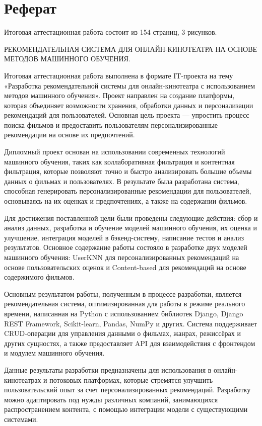 \chapter*{Реферат}

Итоговая аттестационная работа состоит из 154 страниц, 3 рисунков.

РЕКОМЕНДАТЕЛЬНАЯ СИСТЕМА ДЛЯ ОНЛАЙН-КИНОТЕАТРА НА ОСНОВЕ МЕТОДОВ МАШИННОГО ОБУЧЕНИЯ.

Итоговая аттестационная работа выполнена в формате IT-проекта на тему «Разработка рекомендательной системы для онлайн-кинотеатра с использованием методов машинного обучения». Проект направлен на создание платформы, которая объединяет возможности хранения, обработки данных и персонализации рекомендаций для пользователей. Основная цель проекта — упростить процесс поиска фильмов и предоставить пользователям персонализированные рекомендации на основе их предпочтений.

Дипломный проект основан на использовании современных технологий машинного обучения, таких как коллаборативная фильтрация и контентная фильтрация, которые позволяют точно и быстро анализировать большие объемы данных о фильмах и пользователях. В результате была разработана система, способная генерировать персонализированные рекомендации для пользователей, основываясь на их оценках и предпочтениях, а также на содержании фильмов.

Для достижения поставленной цели были проведены следующие действия: сбор и анализ данных, разработка и обучение моделей машинного обучения, их оценка и улучшение, интеграция моделей в бэкенд-систему, написание тестов и анализ результатов. Основное содержание работы состояло в разработке двух моделей машинного обучения: UserKNN для персонализированных рекомендаций на основе пользовательских оценок и Content-based для рекомендаций на основе содержимого фильмов.

Основным результатом работы, полученным в процессе разработки, является рекомендательная система, оптимизированная для работы в режиме реального времени, написанная на Python с использованием библиотек Django, Django REST Framework, Scikit-learn, Pandas, NumPy и других. Система поддерживает CRUD-операции для управления данными о фильмах, жанрах, режиссёрах и других сущностях, а также предоставляет API для взаимодействия с фронтендом и модулем машинного обучения.

Данные результаты разработки предназначены для использования в онлайн-кинотеатрах и потоковых платформах, которые стремятся улучшить пользовательский опыт за счет персонализированных рекомендаций. Разработку можно адаптировать под нужды различных компаний, занимающихся распространением контента, с помощью интеграции модели с существующими системами.


